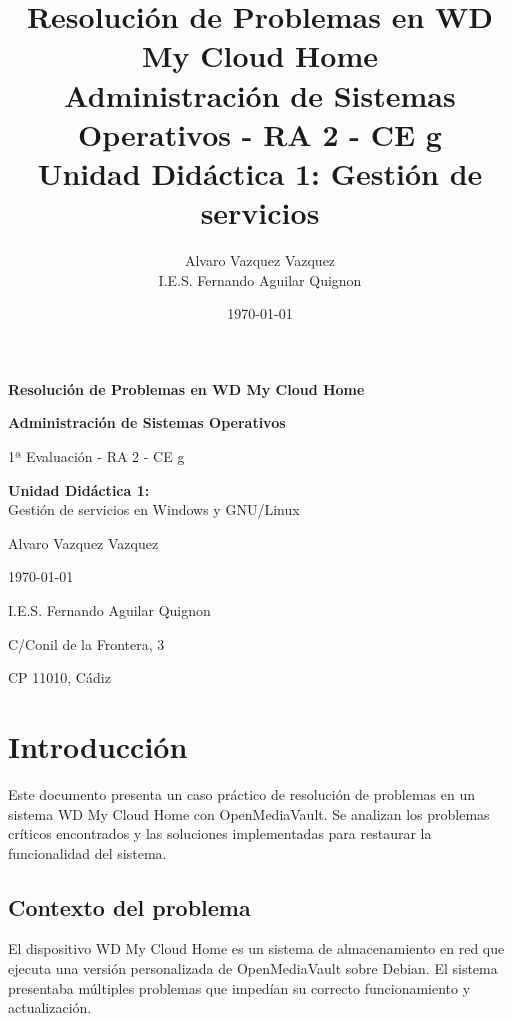 \documentclass[12pt, a4paper]{article}
\title{\textbf{Resolución de Problemas en WD My Cloud Home} \\
\large Administración de Sistemas Operativos - RA 2 - CE g \\
Unidad Didáctica 1: Gestión de servicios}
\author{Alvaro Vazquez Vazquez \\ I.E.S. Fernando Aguilar Quignon}
\date{\today}
\begin{document}
\begin{titlepage}
    \centering
    \vspace*{2cm}
    
    {\Huge \textbf{Resolución de Problemas en WD My Cloud Home} \par}
    \vspace{0.5cm}
    {\Large \textbf{Administración de Sistemas Operativos} \par}
    \vspace{0.5cm}
    {\large 1ª Evaluación - RA 2 - CE g \par}
    \vspace{1cm}
    {\large \textbf{Unidad Didáctica 1:} \\ Gestión de servicios en Windows y GNU/Linux \par}
    \vspace{2cm}
    
    {\Large Alvaro Vazquez Vazquez \par}
    \vspace{0.5cm}
    {\large \today \par}
    \vspace{2cm}
    
    \vfill
    {\large I.E.S. Fernando Aguilar Quignon \par}
    {\small C/Conil de la Frontera, 3 \par}
    {\small CP 11010, Cádiz \par}
\end{titlepage}

\tableofcontents
\clearpage

\section{Introducción}
\label{sec:introduccion}

Este documento presenta un caso práctico de resolución de problemas en un sistema WD My Cloud Home con OpenMediaVault. Se analizan los problemas críticos encontrados y las soluciones implementadas para restaurar la funcionalidad del sistema.

\subsection{Contexto del problema}
El dispositivo WD My Cloud Home es un sistema de almacenamiento en red que ejecuta una versión personalizada de OpenMediaVault sobre Debian. El sistema presentaba múltiples problemas que impedían su correcto funcionamiento y actualización.
\end{document}
